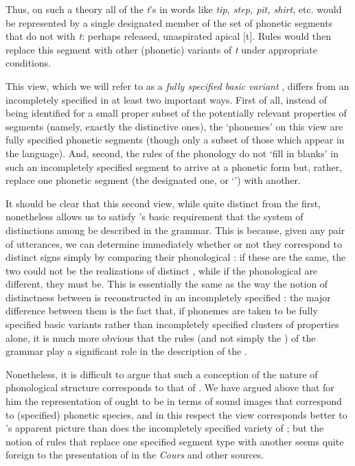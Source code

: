 Thus, on such a theory all of the \emph{t}'s in  words like
\emph{tip, step, pit, shirt}, etc. would be represented by a single
designated member of the set of phonetic segments that do not 
with \emph{t}: perhaps released, unaspirated apical {[t]}. Rules would
then replace this segment with other (phonetic) variants of \emph{t}
under appropriate conditions.

This view, which we will refer to as a \textit{fully specified basic
  variant} , differs from an incompletely specified
 in at least two important ways. First of all, instead
of being identified for a small proper subset of the potentially
relevant properties of segments (namely, exactly the distinctive
ones), the `phonemes' on this view are fully specified phonetic
segments (though only a subset of those which appear in the
language). And, second, the {rules} of the phonology do not `fill in
blanks' in such an incompletely specified segment to arrive at a
phonetic form but, rather, replace one phonetic segment (the
designated one, or `') with another.

It should be clear that this second view, while quite distinct from
the first, nonetheless allows us to satisfy {\Saussure}'s basic
requirement that the system of distinctions among \emph{}
be described in the grammar. This is because, given any pair of
utterances, we can determine immediately whether or not they
correspond to distinct signs simply by comparing their phonological
: if these are the same, the two could not be the
realizations of distinct \emph{}, while if the phonological
 are different, they must be. This is essentially the
same as the way the notion of distinctness between \emph{}
is reconstructed in an incompletely specified : the
major difference between them is the fact that, if phonemes are taken
to be fully specified basic variants rather than incompletely
specified clusters of properties alone, it is much more obvious that
the {rules} (and not simply the ) of the grammar
play a significant role in the description of the .

Nonetheless, it is difficult to argue that such a conception of the
nature of phonological structure corresponds to that of {\Saussure}. We
have argued above that for him the representation of
\emph{} ought to be in terms of sound images that
correspond to (specified) phonetic species, and in this respect the
 view corresponds better to {\Saussure}'s
apparent picture than does the incompletely specified variety of
; but the notion of {rules} that replace one specified
segment type with another seems quite foreign to the presentation of
 in the \textsl{Cours} and other sources.

